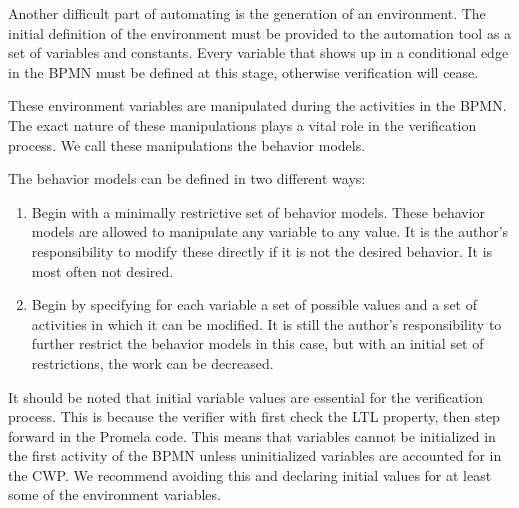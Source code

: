 Another difficult part of automating is the generation of an environment. The initial definition of the environment must be provided to the automation tool as a set of variables and constants. Every variable that shows up in a conditional edge in the BPMN must be defined at this stage, otherwise verification will cease.

These environment variables are manipulated during the activities in the BPMN. The exact nature of these manipulations plays a vital role in the verification process. We call these manipulations the behavior models.

The behavior models can be defined in two different ways:

\begin{enumerate}
    \item Begin with a minimally restrictive set of behavior models. These behavior models are allowed to manipulate any variable to any value. It is the author's responsibility to modify these directly if it is not the desired behavior. It is most often not desired.
    \item Begin by specifying for each variable a set of possible values and a set of activities in which it can be modified. It is still the author's responsibility to further restrict the behavior models in this case, but with an initial set of restrictions, the work can be decreased.
\end{enumerate}

It should be noted that initial variable values are essential for the verification process. This is because the verifier with first check the LTL property, then step forward in the Promela code. This means that variables cannot be initialized in the first activity of the BPMN unless uninitialized variables are accounted for in the CWP. We recommend avoiding this and declaring initial values for at least some of the environment variables.